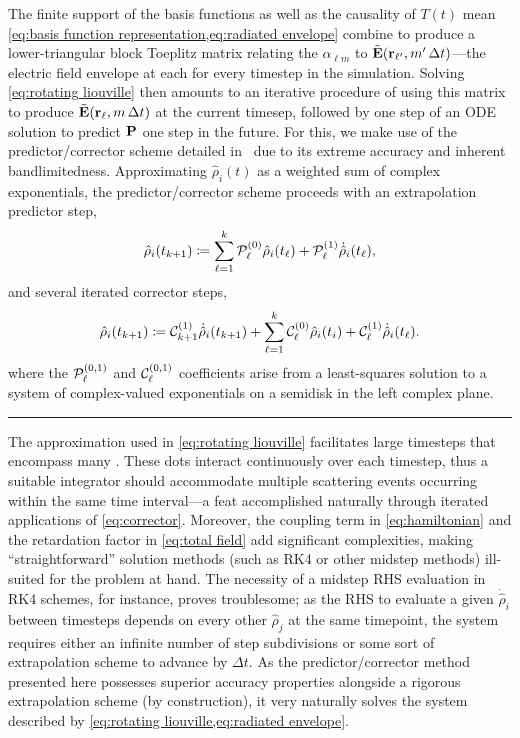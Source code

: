The finite support of the basis functions as well as the causality of $T(t)$ mean \cref{eq:basis function representation,eq:radiated envelope} combine to produce a lower-triangular block Toeplitz matrix relating the $\alpha_{\ell m}$ to $\tilde{\vb{E}}(\vb{r}_{\ell'}, m' \, \Delta t)$---the electric field envelope at each \qd{} for every timestep in the simulation.
Solving \cref{eq:rotating liouville} then amounts to an iterative procedure of using this matrix to produce $\tilde{\vb{E}}(\vb{r}_\ell, m \, \Delta t)$ at the current timesep, followed by one step of an ODE solution to predict $\vb{P}$ one step in the future.
For this, we make use of the predictor/corrector scheme detailed in~\cite{Glaser2009} due to its extreme accuracy and inherent bandlimitedness.
Approximating $\hat{\rho}_i(t)$ as a weighted sum of complex exponentials, the predictor/corrector scheme proceeds with an extrapolation predictor step,
\begin{equation}
  \hat{\rho}_i(t_{k + 1}) \coloneqq \sum_{\ell = 1}^k \mathcal{P}_\ell^{\qty(0)} \hat{\rho}_i(t_\ell) + \mathcal{P}_\ell^{\qty(1)} \dot{\hat{\rho}}_i(t_\ell),
  \label{eq:predictor}
\end{equation}
and several iterated corrector steps,
\begin{equation}
  \hat{\rho}_i(t_{k + 1}) \coloneqq \mathcal{C}_{k+1}^{\qty(1)} \dot{\hat{\rho}}_i(t_{k + 1}) + \sum_{\ell = 1}^k \mathcal{C}_\ell^{\qty(0)} \hat{\rho}_i(t_i) + \mathcal{C}_\ell^{\qty(1)} \dot{\hat{\rho}}_i(t_\ell).
  \label{eq:corrector}
\end{equation}
where the $\mathcal{P}_\ell^{\qty(0, 1)}$ and $\mathcal{C}_\ell^{\qty(0, 1)}$ coefficients arise from a least-squares solution to a system of complex-valued exponentials on a semidisk in the left complex plane.

\noindent\rule[0.5ex]{\linewidth}{1pt}

The approximation used in \cref{eq:rotating liouville} facilitates large timesteps that encompass many \qds{}.
These dots interact continuously over each timestep, thus a suitable integrator should accommodate multiple scattering events occurring within the same time interval---a feat accomplished naturally through iterated applications of \cref{eq:corrector}.
Moreover, the coupling term in \cref{eq:hamiltonian} and the retardation factor in \cref{eq:total field} add significant complexities, making ``straightforward'' solution methods (such as RK4 or other midstep methods) ill-suited for the problem at hand.
The necessity of a midstep RHS evaluation in RK4 schemes, for instance, proves troublesome; as the RHS to evaluate a given $\dot{\hat{\rho}}_i$ between timesteps depends on every other $\hat{\rho}_j$ at the same timepoint, the system requires either an infinite number of step subdivisions or some sort of extrapolation scheme to advance by $\Delta t$.
As the predictor/corrector method presented here possesses superior accuracy properties alongside a rigorous extrapolation scheme (by construction), it very naturally solves the system described by \cref{eq:rotating liouville,eq:radiated envelope}.

